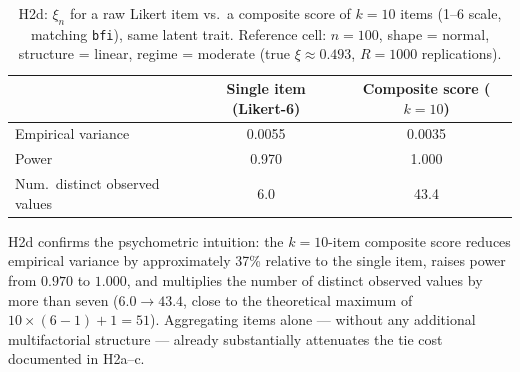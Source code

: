 \documentclass[article]{ajs}
\begin{document}
\begin{table}[H]
\caption{\label{tab:h2d}H2d: $\xi_n$ for a raw Likert item vs.\ a composite score of $k=10$ items (1--6 scale, matching \texttt{bfi}), same latent trait. Reference cell: $n=100$, shape = normal, structure = linear, regime = moderate (true $\xi \approx 0.493$, $R=1000$ replications).}
\begin{center}
\begin{tabular}{lcc}
\toprule
 & Single item (Likert-6) & Composite score ($k=10$) \\
\midrule
Empirical variance & 0.0055 & 0.0035 \\
Power          & 0.970  & 1.000  \\
Num.\ distinct observed values & 6.0 & 43.4 \\
\bottomrule
\end{tabular}
\end{center}
\end{table}

H2d confirms the psychometric intuition: the $k=10$-item composite
score reduces empirical variance by approximately 37\% relative to the
single item, raises power from $0.970$ to $1.000$, and multiplies the
number of distinct observed values by more than seven
($6.0 \to 43.4$, close to the theoretical maximum of $10\times(6-1)+1=51$).
Aggregating items alone --- without any additional multifactorial
structure --- already substantially attenuates the tie cost documented
in H2a--c.
\end{document}
